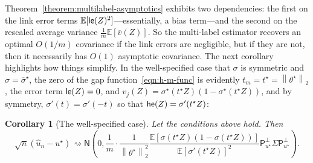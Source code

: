 \documentclass[11pt]{article}
\newcommand{\E}{\mathbb{E}}
\newcommand{\norm}[1]{\left\|{#1}\right\|} %
\newcommand{\what}[1]{\widehat{#1}}
\newcommand{\wb}[1]{\overline{#1}}
\newcommand{\normal}{\mathsf{N}}
\newcommand{\proj}{\mathsf{P}}
\newcommand{\projperp}{\proj_{u\opt}^\perp}
\newcommand{\ltwo}[1]{\norm{#1}_2} %
\newcommand{\<}{\langle} %
\renewcommand{\>}{\rangle}
\newcommand{\cd}{\rightsquigarrow}
\newcommand{\opt}{^\star}
\newtheorem{corollary}{Corollary}
\begin{document}
Theorem~\ref{theorem:multilabel-asymptotics} exhibits two dependencies: the
first on the link error terms $\E[\linkerr(Z)^2]$---essentially, a bias
term---and the second on the rescaled average variance $\frac{1}{m}
\E[\wb{v}(Z)]$. So the multi-label estimator recovers
an optimal $O(1/m)$ covariance if the link errors are negligible, but if
they are not, then it necessarily has $O(1)$ asymptotic covariance.
The next corollary highlights
how things simplify.
In the well-specified
case that $\sigma$ is symmetric and $\sigma = \wb{\sigma}\opt$, 
the zero of the gap
function~\eqref{eqn:h-m-func} is evidently $t_m = t\opt =
\ltwo{\theta\opt}$, the error term $\mathsf{le}(Z) = 0$,
and $v_j(Z) = \sigma\opt(t\opt Z)(1 - \sigma\opt(t\opt Z))$, and by symmetry,
$\sigma'(t) = \sigma'(-t)$ so that
$\hessfunc(Z) = \sigma'(t\opt Z)$:
\begin{corollary}[The well-specified case] \label{cor:well-specified-normalized-cov}
	Let the conditions above hold. Then
	\begin{equation*}
		\sqrt{n}(\what{u}_n - u\opt)
		\cd \normal\left(0, \frac{1}{m} \cdot
		\frac{1}{\ltwo{\theta\opt}^2}
		\frac{\E[\sigma(t\opt Z) (1 - \sigma(t\opt Z))]}{\E[\sigma'(t\opt Z)]^2}
		\projperp \Sigma \projperp \right).
	\end{equation*}
\end{corollary}
\end{document}
